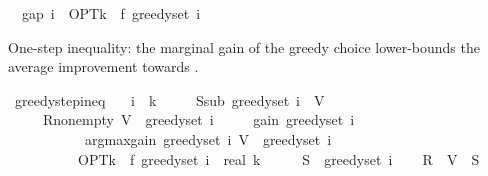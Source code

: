 \begin{isabellebody}
\ \ {\isachardoublequoteopen}gap\ i\ {\isacharequal}{\kern0pt}\ OPT{\isacharunderscore}{\kern0pt}k\ {\isacharminus}{\kern0pt}\ f\ {\isacharparenleft}{\kern0pt}greedy{\isacharunderscore}{\kern0pt}set\ i{\isacharparenright}{\kern0pt}{\isachardoublequoteclose}%
\begin{isamarkuptext}%
One-step inequality: the marginal gain of the greedy choice lower-bounds
  the average improvement towards .%
\end{isamarkuptext}\isamarkuptrue%
\isamarkupfalse%
\ greedy{\isacharunderscore}{\kern0pt}step{\isacharunderscore}{\kern0pt}ineq{\isacharcolon}{\kern0pt}\isanewline
\ \ \ {\isachardoublequoteopen}i\ {\isacharless}{\kern0pt}\ k{\isachardoublequoteclose}\isanewline
\ \ \ \ \ S{\isacharunderscore}{\kern0pt}sub{\isacharcolon}{\kern0pt}\ {\isachardoublequoteopen}greedy{\isacharunderscore}{\kern0pt}set\ i\ {\isasymsubseteq}\ V{\isachardoublequoteclose}\isanewline
\ \ \ \ \ R{\isacharunderscore}{\kern0pt}nonempty{\isacharcolon}{\kern0pt}\ {\isachardoublequoteopen}V\ {\isacharminus}{\kern0pt}\ greedy{\isacharunderscore}{\kern0pt}set\ i\ {\isasymnoteq}\ {\isacharbraceleft}{\kern0pt}{\isacharbraceright}{\kern0pt}{\isachardoublequoteclose}\isanewline
\ \ \ {\isachardoublequoteopen}gain\ {\isacharparenleft}{\kern0pt}greedy{\isacharunderscore}{\kern0pt}set\ i{\isacharparenright}{\kern0pt}\isanewline
\ \ \ \ \ \ \ \ \ \ \ {\isacharparenleft}{\kern0pt}argmax{\isacharunderscore}{\kern0pt}gain\ {\isacharparenleft}{\kern0pt}greedy{\isacharunderscore}{\kern0pt}set\ i{\isacharparenright}{\kern0pt}\ {\isacharparenleft}{\kern0pt}V\ {\isacharminus}{\kern0pt}\ greedy{\isacharunderscore}{\kern0pt}set\ i{\isacharparenright}{\kern0pt}{\isacharparenright}{\kern0pt}\isanewline
\ \ \ \ \ \ \ \ \ {\isasymge}\ {\isacharparenleft}{\kern0pt}OPT{\isacharunderscore}{\kern0pt}k\ {\isacharminus}{\kern0pt}\ f\ {\isacharparenleft}{\kern0pt}greedy{\isacharunderscore}{\kern0pt}set\ i{\isacharparenright}{\kern0pt}{\isacharparenright}{\kern0pt}\ {\isacharslash}{\kern0pt}\ real\ k{\isachardoublequoteclose}\isanewline
%
\isadelimproof
%
\endisadelimproof
%
\isatagproof
{}\isamarkupfalse%
\ {\isacharminus}{\kern0pt}\isanewline
\ \ \isamarkupfalse%
\ {\isacharquery}{\kern0pt}S\ {\isacharequal}{\kern0pt}\ {\isachardoublequoteopen}greedy{\isacharunderscore}{\kern0pt}set\ i{\isachardoublequoteclose}\isanewline
\ \ \isamarkupfalse%
\ {\isacharquery}{\kern0pt}R\ {\isacharequal}{\kern0pt}\ {\isachardoublequoteopen}V\ {\isacharminus}{\kern0pt}\ {\isacharquery}{\kern0pt}S{\isachardoublequoteclose}\isanewline

\end{isabellebody}
